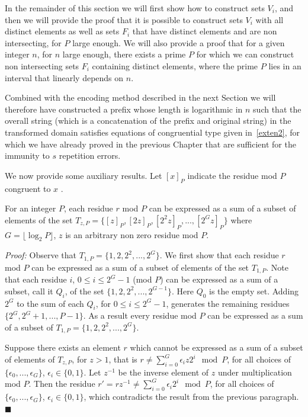 In the remainder of this section we will first show how to
construct sets $V_i$, and then we will provide the proof that it
is possible to construct sets $V_i$ with all distinct elements as
well as  sets $F_i$ that have distinct elements and are non
intersecting, for $P$ large enough. We will also provide a proof
that for a given integer $n$, for $n$ large enough, there exists a
prime $P$ for which we can construct non intersecting sets $F_i$
containing distinct elements, where the prime $P$ lies in an
interval that linearly depends on $n$.

Combined with the encoding method described in the next Section we
will therefore have constructed a prefix whose length is
logarithmic in $n$ such that the overall string (which is a
concatenation of the prefix and original string) in the
transformed domain satisfies equations of congruential type given
in~\eqref{exten2}, for which we have already proved in the
previous Chapter that are sufficient for the immunity to $s$
repetition errors.



We now provide some auxiliary results. Let $[x]_P$ indicate the
residue mod $P$ congruent to $x$ .

\begin{lemma}\label{generates} For an integer $P$, each residue $r$ mod $P$ can be expressed as a
sum of a subset of elements of the set
$T_{z,P}=\{[z]_P,[2z]_P,[2^2z]_P,...,[2^{G}z]_P\}$ where
$G=\lfloor \log_2 P \rfloor $, $z$ is an arbitrary non zero
residue mod $P$.
\end{lemma}

\noindent \textit{Proof:} Observe that
$T_{1,P}=\{1,2,2^2,...,2^{G}\}$. We first show that each residue
$r$ mod $P$ can be expressed as a sum of a subset of elements of
the set $T_{1,P}$. Note that each residue $i$, $0 \leq i \leq
2^G-1$ (mod $P$) can be expressed as a sum of a subset, call it
$Q_i$, of the set $\{1,2,2^2,...,2^{G-1}\}$. Here $Q_0$ is the
empty set. Adding $2^G$ to the sum of each $Q_i$, for $0 \leq i
\leq 2^G-1$, generates the remaining residues $\{2^G,
2^G+1,...,P-1 \}$. As a result every residue mod $P$ can be
expressed as a sum of a subset of $T_{1,P}=\{1,2,2^2,...,2^{G}\}$.

Suppose there exists an element $r$ which cannot be expressed as a
sum of a subset of elements of $T_{z,P}$, for $z>1$, that is $r
\neq \sum_{i=0}^G \epsilon_i z 2^i \mod P$, for all choices of
$\{\epsilon_0,...,\epsilon_G\}$, $\epsilon_i \in \{0,1\}$. Let
$z^{-1}$ be the inverse element of $z$ under multiplication mod
$P$. Then the residue $r' = rz^{-1} \neq \sum_{i=0}^G \epsilon_i
2^i \mod P$, for all choices of $\{\epsilon_0,...,\epsilon_G\}$,
$\epsilon_i \in \{0,1\}$, which contradicts the result from the
previous paragraph.\hfill$\blacksquare$

